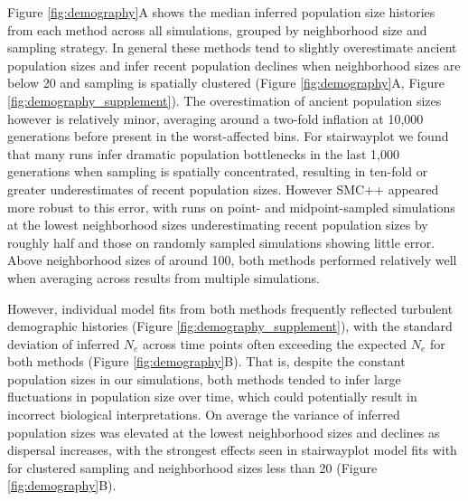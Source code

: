 \documentclass[10pt,twoside,lineno,hidelinks]{preprint}
\begin{document}
Figure \ref{fig:demography}A shows the median inferred population size histories from each method across all simulations, grouped by neighborhood size and sampling strategy. In general these methods tend to slightly overestimate ancient population sizes and infer recent population declines when neighborhood sizes are below 20 and sampling is spatially clustered (Figure \ref{fig:demography}A, Figure \ref{fig:demography_supplement}). The overestimation of ancient population sizes however is relatively minor, averaging around a two-fold inflation at 10,000 generations before present in the worst-affected bins. For stairwayplot we found that many runs infer dramatic population bottlenecks in the last 1,000 generations when sampling is spatially concentrated, resulting in ten-fold or greater underestimates of recent population sizes. However SMC++ appeared more robust to this error, with runs on point- and midpoint-sampled simulations at the lowest neighborhood sizes underestimating recent population sizes by roughly half and those on randomly sampled simulations showing little error. Above neighborhood sizes of around 100, both methods performed relatively well when averaging across results from multiple simulations. 

However, individual model fits from both methods frequently reflected turbulent demographic histories (Figure \ref{fig:demography_supplement}), with the standard deviation of inferred $N_{e}$ across time points often exceeding the expected $N_{e}$ for both methods (Figure \ref{fig:demography}B). That is, despite the constant population sizes in our simulations, both methods tended to infer large fluctuations in population size over time, which could potentially result in incorrect biological interpretations. On average the variance of inferred population sizes was elevated at the lowest neighborhood sizes and declines as dispersal increases, with the strongest effects seen in stairwayplot model fits with for clustered sampling and neighborhood sizes less than 20 (Figure \ref{fig:demography}B). 
\end{document}
